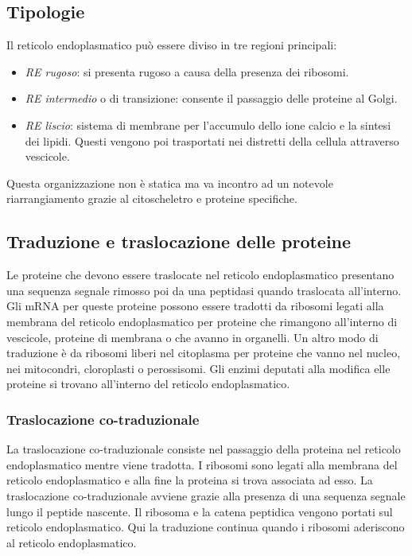 	\subsection{Tipologie}
	Il reticolo endoplasmatico pu\`o essere diviso in tre regioni principali:
	\begin{multicols}{2}
		\begin{itemize}
			\item \emph{RE rugoso}: si presenta rugoso a causa della presenza dei ribosomi.
			\item \emph{RE intermedio} o di transizione: consente il passaggio delle proteine al Golgi.
			\item \emph{RE liscio}: sistema di membrane per l'accumulo dello ione calcio e la sintesi dei lipidi.
				Questi vengono poi trasportati nei distretti della cellula attraverso vescicole.
		\end{itemize}
	\end{multicols}
	Questa organizzazione non \`e statica ma va incontro ad un notevole riarrangiamento grazie al citoscheletro e proteine specifiche.

	\subsection{Traduzione e traslocazione delle proteine}
	Le proteine che devono essere traslocate nel reticolo endoplasmatico presentano una sequenza segnale rimosso poi da una peptidasi quando traslocata all'interno.
	Gli mRNA per queste proteine possono essere tradotti da ribosomi legati alla membrana del reticolo endoplasmatico per proteine che rimangono all'interno di vescicole, proteine di membrana o che avanno in organelli.
	Un altro modo di traduzione \`e da ribosomi liberi nel citoplasma per proteine che vanno nel nucleo, nei mitocondri, cloroplasti o perossisomi.
	Gli enzimi deputati alla modifica elle proteine si trovano all'interno del reticolo endoplasmatico.

		\subsubsection{Traslocazione co-traduzionale}
		La traslocazione co-traduzionale consiste nel passaggio della proteina nel reticolo endoplasmatico mentre viene tradotta.
		I ribosomi sono legati alla membrana del reticolo endoplasmatico e alla fine la proteina si trova associata ad esso.
		La traslocazione co-traduzionale avviene grazie alla presenza di una sequenza segnale lungo il peptide nascente.
		Il ribosoma e la catena peptidica vengono portati sul reticolo endoplasmatico.
		Qui la traduzione continua quando i ribosomi aderiscono al reticolo endoplasmatico.

